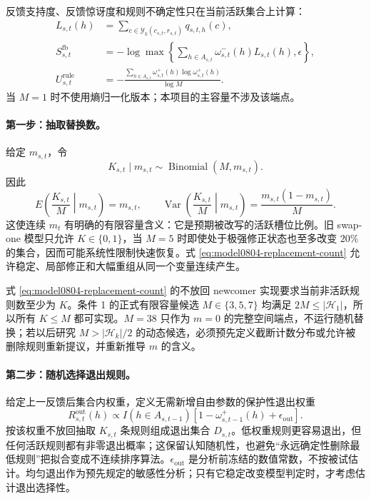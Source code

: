 反馈支持度、反馈惊讶度和规则不确定性只在当前活跃集合上计算：
\begin{align}
    L_{s,t}(h)
    &=\sum_{c\in\mathcal Y_k(c_{s,t},r_{s,t})}
      q_{s,t,h}(c),\\
    S^{\mathrm{fb}}_{s,t}
    &=-\log\max\!\left\{
      \sum_{h\in A_{s,t}}
      \omega^-_{s,t}(h)L_{s,t}(h),\epsilon
      \right\},\\
    U^{\mathrm{rule}}_{s,t}
    &=-\frac{
      \sum_{h\in A_{s,t}}
      \omega^+_{s,t}(h)\log\omega^+_{s,t}(h)}
      {\log M}.
    \label{eq:model0804-surprise-uncertainty}
\end{align}
当 $M=1$ 时不使用熵归一化版本；本项目的主容量不涉及该端点。

\paragraph{第一步：抽取替换数。}
给定 $m_{s,t}$，令
\begin{equation}
    K_{s,t}\mid m_{s,t}
    \sim\operatorname{Binomial}(M,m_{s,t}).
    \label{eq:model0804-replacement-count}
\end{equation}
因此
\begin{equation}
    E\!\left(\frac{K_{s,t}}{M}\middle|m_{s,t}\right)
    =m_{s,t},
    \qquad
    \operatorname{Var}\!\left(\frac{K_{s,t}}{M}\middle|m_{s,t}\right)
    =\frac{m_{s,t}(1-m_{s,t})}{M}.
    \label{eq:model0804-replacement-moments}
\end{equation}
这使连续 $m_t$ 有明确的有限容量含义：它是预期被改写的活跃槽位比例。旧 swap-one 模型只允许 $K\in\{0,1\}$，当 $M=5$ 时即使处于极强修正状态也至多改变 $20\%$ 的集合，因而可能系统性限制快速恢复。式 \ref{eq:model0804-replacement-count} 允许稳定、局部修正和大幅重组从同一个变量连续产生。

式 \ref{eq:model0804-replacement-count} 的不放回 newcomer 实现要求当前非活跃规则数至少为 $K$。条件 1 的正式有限容量候选 $M\in\{3,5,7\}$ 均满足 $2M\leq|\mathcal H_1|$，所以所有 $K\leq M$ 都可实现。$M=38$ 只作为 $m=0$ 的完整空间端点，不运行随机替换；若以后研究 $M>|\mathcal H_k|/2$ 的动态候选，必须预先定义截断计数分布或允许被删除规则重新提议，并重新推导 $m$ 的含义。

\paragraph{第二步：随机选择退出规则。}
给定上一反馈后集合内权重，定义无需新增自由参数的保护性退出权重
\begin{equation}
    R^{\mathrm{out}}_{s,t}(h)
    \propto I(h\in A_{s,t-1})
    \left[1-\omega^+_{s,t-1}(h)+\epsilon_{\mathrm{out}}\right].
    \label{eq:model0804-exit-kernel}
\end{equation}
按该权重不放回抽取 $K_{s,t}$ 条规则组成退出集合 $D_{s,t}$。低权重规则更容易退出，但任何活跃规则都有非零退出概率；这保留认知随机性，也避免“永远确定性删除最低规则”把拟合变成不连续排序算法。$\epsilon_{\mathrm{out}}$ 是分析前冻结的数值常数，不按被试估计。均匀退出作为预先规定的敏感性分析；只有它稳定改变模型判定时，才考虑估计退出选择性。

